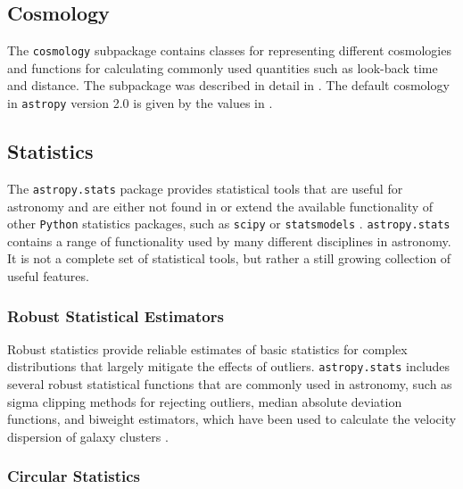 \documentclass[modern]{aastex61}
\newcommand{\package}[1]{\texttt{#1}\xspace}
\newcommand{\python}{\package{Python}}
\newcommand{\astropypkg}{\package{astropy}}
\begin{document}

\subsection{Cosmology}

The \package{cosmology} subpackage contains classes for representing different
cosmologies and functions for calculating commonly used quantities such as
look-back time and distance.   The subpackage was described in detail in
\cite{astropy}.  The default cosmology in \astropypkg version 2.0 is given by
the values in \cite{2016A&A...594A..13P}.

\subsection{Statistics}

The \package{astropy.stats} package provides statistical tools that
are useful for astronomy and are either not found in or extend
the available functionality of other \python statistics packages, such
as \package{scipy} \citep{scipy} or \package{statsmodels}
\citep{seabold2010statsmodels}.  \package{astropy.stats} contains
a range of functionality used by many different disciplines
in astronomy. It is not a complete set of statistical tools, but rather
a still growing collection of useful features.


\subsubsection{Robust Statistical Estimators}

Robust statistics provide reliable estimates of basic statistics for complex
distributions that largely mitigate the effects of outliers.
\package{astropy.stats} includes several robust statistical functions that are
commonly used in astronomy, such as sigma clipping methods for rejecting
outliers, median absolute deviation functions, and biweight estimators,
which have been used to calculate the velocity dispersion of galaxy clusters
\citep{Beers1990}.

\subsubsection{Circular Statistics}
\end{document}
